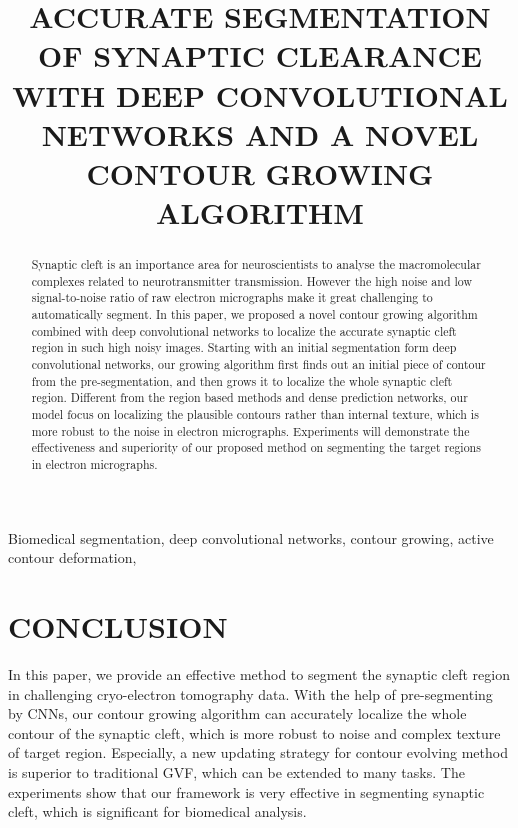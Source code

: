 \documentclass{article}
\begin{document}
\sloppy

\def\x{{\mathbf x}}
\def\L{{\cal L}}


\title{ACCURATE SEGMENTATION OF SYNAPTIC CLEARANCE WITH DEEP CONVOLUTIONAL NETWORKS AND A NOVEL CONTOUR GROWING ALGORITHM}
%
\address{}


\maketitle


%
\begin{abstract}
Synaptic cleft is an importance area for neuroscientists to analyse the macromolecular complexes related to neurotransmitter transmission.
However the high noise and low signal-to-noise ratio of raw electron micrographs make it great challenging to automatically segment.
In this paper, we proposed a novel contour growing algorithm combined with deep convolutional networks to localize the accurate synaptic cleft region in such high noisy images.
Starting with an initial segmentation form deep convolutional networks, our growing algorithm first finds out an initial piece of contour from the pre-segmentation, and then grows it to localize the whole synaptic cleft region.
Different from the region based methods and dense prediction networks, our model focus on localizing the plausible contours rather than internal texture, which is more robust to the noise in electron micrographs.
Experiments will demonstrate the effectiveness and superiority of our proposed method on segmenting the target regions in electron micrographs.
\end{abstract}
%
\begin{keywords}
Biomedical segmentation, deep convolutional networks, contour growing, active contour deformation,
\end{keywords}
%




\section{CONCLUSION}
\label{sec:conclusion}
In this paper, we provide an effective method to segment the synaptic cleft region in challenging cryo-electron tomography data.
With the help of pre-segmenting by CNNs, our contour growing algorithm can accurately localize the whole contour of the synaptic cleft, which is more robust to noise and complex texture of target region.
Especially, a new updating strategy for contour evolving method is superior to traditional GVF, which can be extended to many tasks.
The experiments show that our framework is very effective in segmenting synaptic cleft, which is significant for biomedical analysis.

%
%


\end{document}
